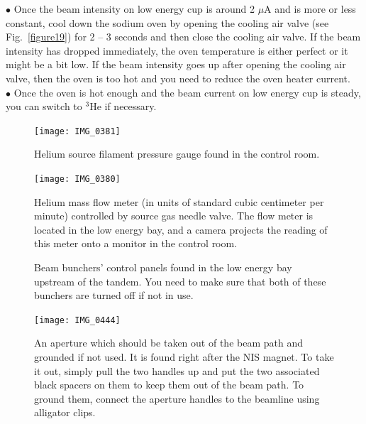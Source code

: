 \documentclass{article}
\begin{document}
$\bullet$ Once the beam intensity on low energy cup is around 2 $\mu$A and is more or less constant, cool down the sodium oven by opening the cooling air valve (see Fig.~\ref{figure19}) for 2 -- 3 seconds and then close the cooling air valve. If the beam intensity has dropped immediately, the oven temperature is either perfect or it might be a bit low. If the beam intensity goes up after opening the cooling air valve, then the oven is too hot and you need to reduce the oven heater current.\\
$\bullet$ Once the oven is hot enough and the beam current on low energy cup is steady, you can switch to $^{3}$He if necessary.

\begin{figure}
\begin{center}
\texttt{[image: IMG\_0381]}\\
\end{center}
\caption{\label{figure1}Helium source filament pressure gauge found in the control room.}
\end{figure}

\begin{figure}
\begin{center}
\texttt{[image: IMG\_0380]}\\
\end{center}
\caption{\label{figure2}Helium mass flow meter (in units of standard cubic centimeter per minute) controlled by source gas needle valve. The flow meter is located in the low energy bay, and a camera projects the reading of this meter onto a monitor in the control room.}
\end{figure}

\begin{figure}
\begin{center}
  \quad
\end{center}
  \caption{\label{figure3}Beam bunchers' control panels found in the low energy bay upstream of the tandem. You need to make sure that both of these bunchers are turned off if not in use.}
\end{figure}

\begin{figure}
\begin{center}
\texttt{[image: IMG\_0444]}\\
\end{center}
\caption{\label{figure4}An aperture which should be taken out of the beam path and grounded if not used. It is found right after the NIS magnet. To take it out, simply pull the two handles up and put the two associated black spacers on them to keep them out of the beam path. To ground them, connect the aperture handles to the beamline using alligator clips.}
\end{figure}
\end{document}
